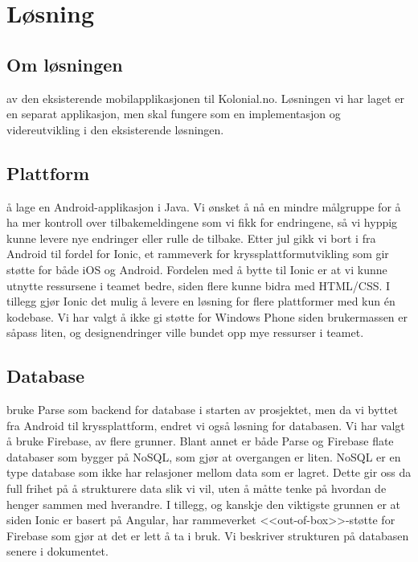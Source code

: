 \chapter{Løsning}

\section{\textbf{Om løsningen}}
 av den eksisterende mobilapplikasjonen til Kolonial.no. Løsningen vi har laget er en separat applikasjon, men skal fungere som en implementasjon og videreutvikling i den eksisterende løsningen.

\section{\textbf{Plattform}}
 å lage en Android-applikasjon i Java. Vi ønsket å nå en mindre målgruppe for å ha mer kontroll over tilbakemeldingene som vi fikk for endringene, så vi hyppig kunne levere nye endringer eller rulle de tilbake. Etter jul gikk vi bort i fra Android til fordel for Ionic, et rammeverk for kryssplattformutvikling som gir støtte for både iOS og Android. Fordelen med å bytte til Ionic er at vi kunne utnytte ressursene i teamet bedre, siden flere kunne bidra med HTML/CSS. I tillegg gjør Ionic det mulig å levere en løsning for flere plattformer med kun én kodebase. Vi har valgt å ikke gi støtte for Windows Phone siden brukermassen er såpass liten, og designendringer ville bundet opp mye ressurser i teamet.

\section{\textbf{Database}}
 bruke Parse som backend for database i starten av prosjektet, men da vi byttet fra Android til kryssplattform, endret vi også løsning for databasen. Vi har valgt å bruke Firebase, av flere grunner. Blant annet er både Parse og Firebase flate databaser som bygger på NoSQL, som gjør at overgangen er liten. NoSQL er en type database som ikke har relasjoner mellom data som er lagret. Dette gir oss da full frihet på å strukturere data slik vi vil, uten å måtte tenke på hvordan de henger sammen med hverandre. I tillegg, og kanskje den viktigste grunnen er at siden Ionic er basert på Angular, har rammeverket <<out-of-box>>-støtte for Firebase som gjør at det er lett å ta i bruk. Vi beskriver strukturen på databasen senere i dokumentet.

